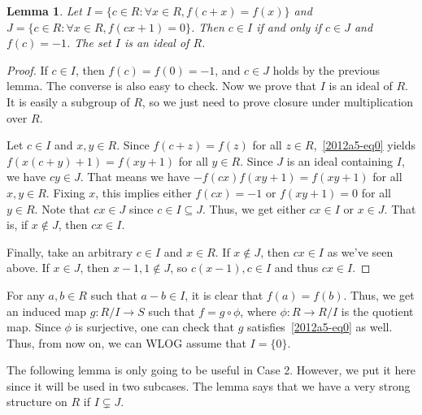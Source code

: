 \documentclass{article}
\newtheorem{lemma}{Lemma}
\begin{document}
\begin{lemma}\label{2012a5-2}
Let $I = \{c \in R : \forall x \in R, f(c + x) = f(x)\}$ and $J = \{c \in R : \forall x \in R, f(cx + 1) = 0\}$.
Then $c \in I$ if and only if $c \in J$ and $f(c) = -1$.
The set $I$ is an ideal of $R$.
\end{lemma}
\begin{proof}
If $c \in I$, then $f(c) = f(0) = -1$, and $c \in J$ holds by the previous lemma.
The converse is also easy to check.
Now we prove that $I$ is an ideal of $R$.
It is easily a subgroup of $R$, so we just need to prove closure under multiplication over $R$.

Let $c \in I$ and $x, y \in R$.
Since $f(c + z) = f(z)$ for all $z \in R$,~\eqref{2012a5-eq0} yields $f(x(c + y) + 1) = f(xy + 1)$ for all $y \in R$.
Since $J$ is an ideal containing $I$, we have $cy \in J$.
That means we have $-f(cx) f(xy + 1) = f(xy + 1)$ for all $x, y \in R$.
Fixing $x$, this implies either $f(cx) = -1$ or $f(xy + 1) = 0$ for all $y \in R$.
Note that $cx \in J$ since $c \in I \subseteq J$.
Thus, we get either $cx \in I$ or $x \in J$.
That is, if $x \notin J$, then $cx \in I$.

Finally, take an arbitrary $c \in I$ and $x \in R$.
If $x \notin J$, then $cx \in I$ as we've seen above.
If $x \in J$, then $x - 1, 1 \notin J$, so $c(x - 1), c \in I$ and thus $cx \in I$.
\end{proof}

For any $a, b \in R$ such that $a - b \in I$, it is clear that $f(a) = f(b)$.
Thus, we get an induced map $g : R/I \to S$ such that $f = g \circ \phi$, where $\phi : R \to R/I$ is the quotient map.
Since $\phi$ is surjective, one can check that $g$ satisfies~\eqref{2012a5-eq0} as well.
Thus, from now on, we can WLOG assume that $I = \{0\}$.

The following lemma is only going to be useful in Case 2.
However, we put it here since it will be used in two subcases.
The lemma says that we have a very strong structure on $R$ if $I \subsetneq J$.
\end{document}
